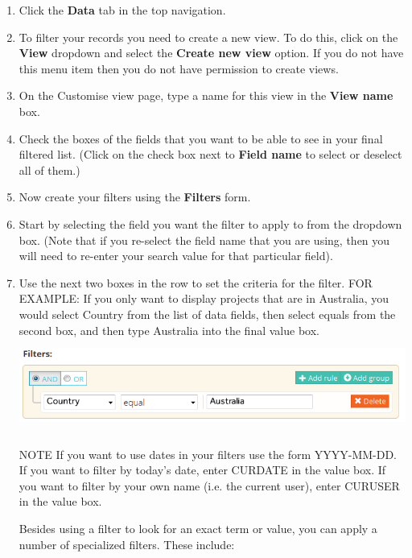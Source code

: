 \documentclass{ctrlo-int-toc}
\begin{document}
\begin{enumerate}
\item Click the \textbf{Data} tab in the top navigation.
\item To filter your records you need to create a new view. To do this, click on the \textbf{View} dropdown and select the \textbf{Create new view} option. If you do not have this menu item then you do not have permission to create views.
\item On the Customise view page, type a name for this view in the \textbf{View name} box.
\item Check the boxes of the fields that you want to be able to see in your final filtered list. (Click on the check box next to \textbf{Field name} to select or deselect all of them.)
\item Now create your filters using the \textbf{Filters} form.
\item Start by selecting the field you want the filter to apply to from the dropdown box. (Note that if you re-select the field name that you are using, then you will need to re-enter your search value for that particular field).
\item Use the next two boxes in the row to set the criteria for the filter. FOR EXAMPLE: If you only want to display projects that are in Australia, you would select Country from the list of data fields, then select equals from the second box, and then type Australia into the final value box. \newline
\includegraphics[width=15.921cm,height=3.069cm]{userguide-img/userguide-img002.png}
 

\begin{notebox}
NOTE
If you want to use dates in your filters use the form YYYY-MM-DD.\newline
If you want to filter by today's date, enter CURDATE in the value box. If you want to filter by your own name (i.e. the current user), enter CURUSER in the value box. 
\end{notebox}

Besides using a filter to look for an exact term or value, you can apply a number of specialized filters. These include:


\end{enumerate}
\end{document}
